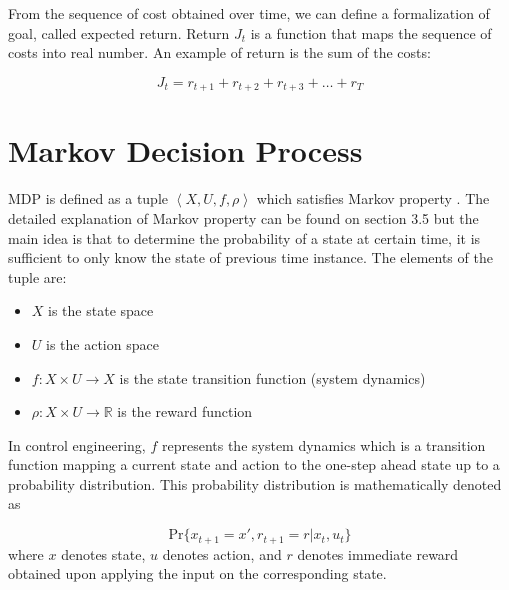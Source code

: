 From the sequence of cost obtained over time, we can define a formalization of goal, called expected return. Return $J_t$ is a function that maps the sequence of costs into real number. An example of return is the sum of the costs:

\begin{equation}
J_t = r_{t+1} + r_{t+2} + r_{t+3} + \dots + r_T
\end{equation} 

\section{Markov Decision Process} \label{sec:mdp}
\ac{MDP} is defined as a tuple $\left<X, U, f, \rho \right>$ which satisfies Markov property \cite{babuskaRL}. The detailed explanation of Markov property can be found on \cite{sutton1998reinforcement} section 3.5 but the main idea is that to determine the probability of a state at certain time, it is sufficient to only know the state of previous time instance. The elements of the tuple are:
\begin{itemize}
	\item $X$ is the state space
	\item $U$ is the action space
	\item $f :X \times U \rightarrow X$ is the state transition function (system dynamics) 
	\item $\rho:X \times U \rightarrow \mathbb{R}$ is the reward function
\end{itemize}

In control engineering, $f$ represents the system dynamics which is a transition function mapping a current state and action to the one-step ahead state up to a probability distribution. This probability distribution is mathematically denoted as

\begin{equation}
	\text{Pr}\{x_{t+1} = x', r_{t+1} = r| x_t, u_t \}
	\label{eq:markov}
\end{equation}
where $x$ denotes state, $u$ denotes action, and $r$ denotes immediate reward obtained upon applying the input on the corresponding state. 



